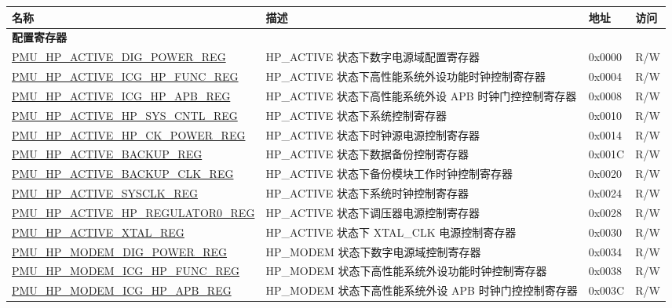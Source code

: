 \begin{longtable}{ | l | p{6cm} | l | l | }
\hline\rowcolor{lightgray}
\textbf{名称} & \textbf{描述} &  \textbf{地址} & \textbf{访问} \\ \hline
\endhead
\multicolumn{4}{|l|}{\textbf{配置寄存器}} \\ \hline
\hyperref[regdesc:PMUHPACTIVEDIGPOWERREG]{PMU\_HP\_ACTIVE\_DIG\_POWER\_REG} & HP\_ACTIVE 状态下数字电源域配置寄存器 & 0x0000 & R/W \\ \hline
\hyperref[regdesc:PMUHPACTIVEICGHPFUNCREG]{PMU\_HP\_ACTIVE\_ICG\_HP\_FUNC\_REG} & HP\_ACTIVE 状态下高性能系统外设功能时钟控制寄存器 & 0x0004 & R/W \\ \hline
\hyperref[regdesc:PMUHPACTIVEICGHPAPBREG]{PMU\_HP\_ACTIVE\_ICG\_HP\_APB\_REG} & HP\_ACTIVE 状态下高性能系统外设 APB 时钟门控控制寄存器 & 0x0008 & R/W \\ \hline
\hyperref[regdesc:PMUHPACTIVEHPSYSCNTLREG]{PMU\_HP\_ACTIVE\_HP\_SYS\_CNTL\_REG} & HP\_ACTIVE 状态下系统控制寄存器 & 0x0010 & R/W \\ \hline
\hyperref[regdesc:PMUHPACTIVEHPCKPOWERREG]{PMU\_HP\_ACTIVE\_HP\_CK\_POWER\_REG} & HP\_ACTIVE 状态下时钟源电源控制寄存器 & 0x0014 & R/W \\ \hline
\hyperref[regdesc:PMUHPACTIVEBACKUPREG]{PMU\_HP\_ACTIVE\_BACKUP\_REG} & HP\_ACTIVE 状态下数据备份控制寄存器 & 0x001C & R/W \\ \hline
\hyperref[regdesc:PMUHPACTIVEBACKUPCLKREG]{PMU\_HP\_ACTIVE\_BACKUP\_CLK\_REG} & HP\_ACTIVE 状态下备份模块工作时钟控制寄存器 & 0x0020 & R/W \\ \hline
\hyperref[regdesc:PMUHPACTIVESYSCLKREG]{PMU\_HP\_ACTIVE\_SYSCLK\_REG} & HP\_ACTIVE 状态下系统时钟控制寄存器  & 0x0024 & R/W \\ \hline
\hyperref[regdesc:PMUHPACTIVEHPREGULATOR0REG]{PMU\_HP\_ACTIVE\_HP\_REGULATOR0\_REG} & HP\_ACTIVE 状态下调压器电源控制寄存器 & 0x0028 & R/W \\ \hline
\hyperref[regdesc:PMUHPACTIVEXTALREG]{PMU\_HP\_ACTIVE\_XTAL\_REG} & HP\_ACTIVE 状态下 XTAL\_CLK 电源控制寄存器 & 0x0030 & R/W \\ \hline
\hyperref[regdesc:PMUHPMODEMDIGPOWERREG]{PMU\_HP\_MODEM\_DIG\_POWER\_REG} & HP\_MODEM 状态下数字电源域控制寄存器 & 0x0034 & R/W \\ \hline
\hyperref[regdesc:PMUHPMODEMICGHPFUNCREG]{PMU\_HP\_MODEM\_ICG\_HP\_FUNC\_REG} & HP\_MODEM 状态下高性能系统外设功能时钟控制寄存器& 0x0038 & R/W \\ \hline
\hyperref[regdesc:PMUHPMODEMICGHPAPBREG]{PMU\_HP\_MODEM\_ICG\_HP\_APB\_REG} & HP\_MODEM 状态下高性能系统外设 APB 时钟门控控制寄存器 & 0x003C & R/W \\ \hline

\end{longtable}
